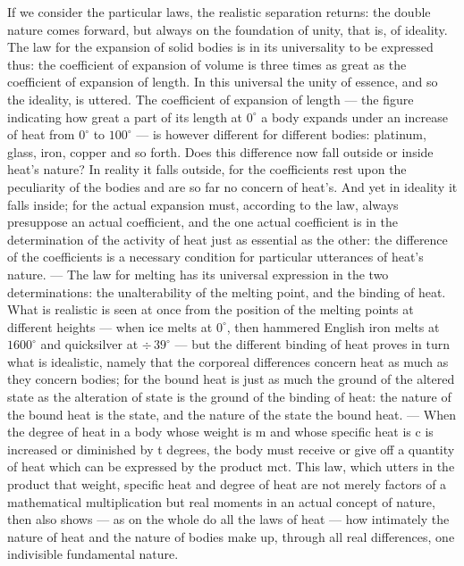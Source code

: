 \documentclass[12pt,a4paper]{book}
\begin{document}
If we consider the particular laws, the realistic separation returns: the double nature comes forward, but always on the
foundation of unity, that is, of ideality. The law for the expansion of solid bodies is in its universality to be
expressed thus: the coefficient of expansion of volume is three times as great as the coefficient of expansion of length.
In this universal the unity of essence, and so the ideality, is uttered. The coefficient of expansion of length --- the
figure indicating how great a part of its length at $0^{\circ}$ a body expands
under an increase of heat from $0^{\circ}$ to $100^{\circ}$ --- is however different for different bodies: platinum,
glass, iron, copper and so forth. Does this difference now fall outside or inside heat's nature? In reality it falls
outside, for the coefficients rest upon the peculiarity of the bodies and are so far no concern of heat's. And yet in
ideality it falls inside; for the actual expansion must, according to the law, always presuppose an actual coefficient,
and the one actual coefficient is in the determination of the activity of heat just as essential as the other: the
difference of the coefficients is a necessary condition for particular utterances of heat's nature. --- The law for
melting has its universal expression in the two determinations: the unalterability of the melting point, and the binding
of heat. What is realistic is seen at once from the position of the melting points at different heights --- when ice
melts at $0^{\circ}$, then hammered English iron melts at $1600^{\circ}$ and quicksilver at $\div\,39^{\circ}$ --- but the
different binding of heat proves in turn what is idealistic, namely that the corporeal differences concern heat as much as
they concern bodies; for the bound heat is just as much the ground of the altered state as the alteration of state is the
ground of the binding of heat: the nature of the bound heat is the state, and the nature of the state the bound heat. ---
When the degree of heat in a body whose weight is m and whose specific heat is c is increased or diminished by t degrees,
the body must receive or give off a quantity of heat which can be expressed by the product mct. This law, which utters in
the product that weight, specific heat and degree of heat are not merely factors of a mathematical multiplication but real
moments in an actual concept of nature, then also shows --- as on the whole do all the laws of heat --- how intimately the
nature of heat and the nature of bodies make up, through all real differences, one indivisible fundamental nature.
\end{document}
